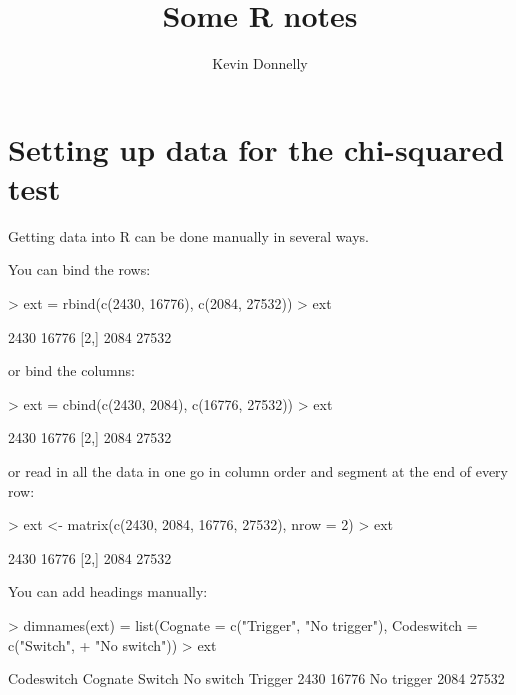 \documentclass[a4paper,10pt]{article}
\title{Some R notes}
\author{Kevin Donnelly}
\date{}
\begin{document}
\maketitle



\section{Setting up data for the chi-squared test}

Getting data into R can be done manually in several ways.

You can bind the rows:
\begin{Schunk}
\begin{Sinput}
> ext = rbind(c(2430, 16776), c(2084, 27532))
> ext
\end{Sinput}
\begin{Soutput}
     [,1]  [,2]
[1,] 2430 16776
[2,] 2084 27532
\end{Soutput}
\end{Schunk}

or bind the columns:
\begin{Schunk}
\begin{Sinput}
> ext = cbind(c(2430, 2084), c(16776, 27532))
> ext
\end{Sinput}
\begin{Soutput}
     [,1]  [,2]
[1,] 2430 16776
[2,] 2084 27532
\end{Soutput}
\end{Schunk}

or read in all the data in one go in column order and segment at the end of every row:
\begin{Schunk}
\begin{Sinput}
> ext <- matrix(c(2430, 2084, 16776, 27532), nrow = 2)
> ext
\end{Sinput}
\begin{Soutput}
     [,1]  [,2]
[1,] 2430 16776
[2,] 2084 27532
\end{Soutput}
\end{Schunk}

You can add headings manually:
\begin{Schunk}
\begin{Sinput}
> dimnames(ext) = list(Cognate = c("Trigger", "No trigger"), Codeswitch = c("Switch", 
+     "No switch"))
> ext
\end{Sinput}
\begin{Soutput}
            Codeswitch
Cognate      Switch No switch
  Trigger      2430     16776
  No trigger   2084     27532
\end{Soutput}
\end{Schunk}
\end{document}
